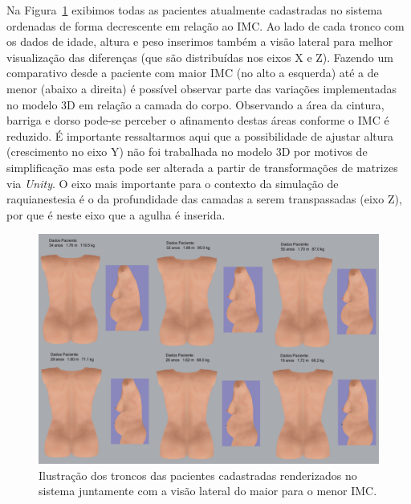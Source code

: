 Na Figura~\ref{fig:pacientesMaiorParaMenorIMCVisaoTroncoELateral} exibimos todas as pacientes atualmente cadastradas no sistema ordenadas de forma decrescente em relação ao \acrshort{IMC}. Ao lado de cada tronco com os dados de idade, altura e peso inserimos também a visão lateral para melhor visualização das diferenças (que são distribuídas nos eixos X e Z). Fazendo um comparativo desde a paciente com maior \acrshort{IMC} (no alto a esquerda) até a de menor (abaixo a direita) é possível observar parte das variações implementadas no modelo 3D em relação a camada do corpo. Observando a área da cintura, barriga e dorso pode-se perceber o afinamento destas áreas conforme o \acrshort{IMC} é reduzido. É importante ressaltarmos aqui que a possibilidade de ajustar altura (crescimento no eixo Y) não foi trabalhada no modelo 3D por motivos de simplificação mas esta pode ser alterada a partir de transformações de matrizes via \textit{Unity}. O eixo mais importante para o contexto da simulação de raquianestesia é o da profundidade das camadas a serem transpassadas (eixo Z), por que é neste eixo que a agulha é inserida.

\begin{figure}[ht!]
    \centering
    \includegraphics[width=0.9\linewidth]{capitulos/figuras/pacientes cadastradas maior para menor imc visao tronco sentado e lateral.png} 
    \caption{Ilustração dos troncos das pacientes cadastradas renderizados no sistema juntamente com a visão lateral do maior para o menor IMC.}
    \label{fig:pacientesMaiorParaMenorIMCVisaoTroncoELateral}
\end{figure}

